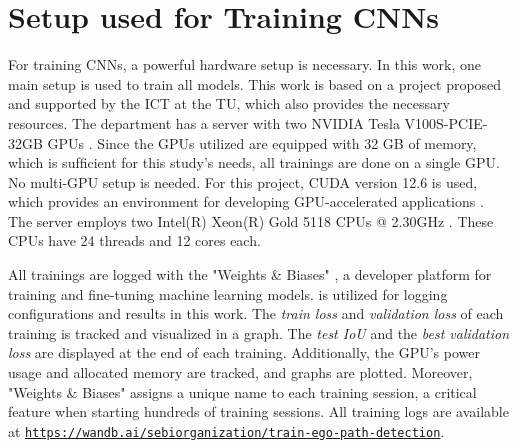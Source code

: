 \clearpage
\section{Setup used for Training CNNs}
\label{sec:trainigsSetup}

For training \ac{CNN}s, a powerful hardware setup is necessary.
In this work, one main setup is used to train all models.
This work is based on a project proposed and supported by the \ac{ICT} at the \ac{TU}, which also provides the necessary resources.
The department has a server with two NVIDIA Tesla V100S-PCIE-32GB \ac{GPU}s \cite{nvidia_v100_datasheet}.
Since the \ac{GPU}s utilized are equipped with 32 GB of memory, which is sufﬁcient for this study's needs, all trainings are done on a single \ac{GPU}.
No multi-\ac{GPU} setup is needed.
For this project, CUDA version 12.6 is used, which provides an environment for developing GPU-accelerated applications \cite{nvidia_cuda_126}.
The server employs two Intel(R) Xeon(R) Gold 5118 CPUs @ 2.30GHz \cite{intel_xeon_gold_prozessor_5118}.
These \ac{CPU}s have 24 threads and 12 cores each.


All trainings are logged with the "Weights \& Biases" \cite{wandb}, a developer platform for training and ﬁne-tuning machine learning models.
\cite{wandb} is utilized for logging configurations and results in this work.
The \textit{train loss} and \textit{validation loss} of each training is tracked and visualized in a graph.
The \textit{test \ac{IoU}} and the \textit{best validation loss} are displayed at the end of each training.
Additionally, the \ac{GPU}'s power usage and allocated memory are tracked, and graphs are plotted.
Moreover, "Weights \& Biases" \cite{wandb} assigns a unique name to each training session, a critical feature when starting hundreds of training sessions.
All training logs are available at \href{https://wandb.ai/sebiorganization/train-ego-path-detection}{\texttt{https://wandb.ai/sebiorganization/train-ego-path-detection}}.


\vspace{2cm}